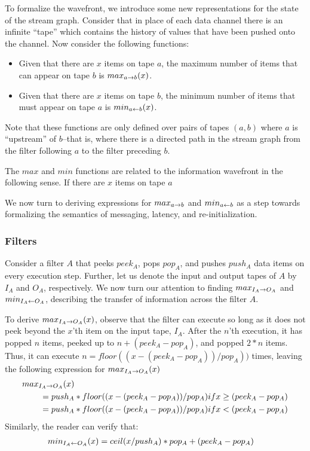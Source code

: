 To formalize the wavefront, we introduce some new representations for
the state of the stream graph.  Consider that in place of each data
channel there is an infinite ``tape'' which contains the history of
values that have been pushed onto the channel.  Now consider the
following functions:

\begin{itemize}

\item Given that there are $x$ items on tape $a$, the maximum number
of items that can appear on tape $b$ is $max_{a \rightarrow b}(x)$.

\item Given that there are $x$ items on tape $b$, the minimum number
of items that must appear on tape $a$ is $min_{a \leftarrow b}(x)$.

\end{itemize}

Note that these functions are only defined over pairs of tapes $(a,
b)$ where $a$ is ``upstream'' of $b$--that is, where there is a
directed path in the stream graph from the filter following $a$ to the
filter preceding $b$.

The $max$ and $min$ functions are related to the information wavefront
in the following sense.  If there are $x$ items on tape $a$

We now turn to deriving expressions for $max_{a \rightarrow b}$ and $min_{a \leftarrow b}$ as
a step towards formalizing the semantics of messaging, latency, and
re-initialization.

\subsubsection{Filters}

Consider a filter $A$ that peeks $peek_A$, pops $pop_A$, and pushes
$push_A$ data items on every execution step.  Further, let us denote
the input and output tapes of $A$ by $I_A$ and $O_A$, respectively.
We now turn our attention to finding $max_{I_A \rightarrow O_A}$ and
$min_{I_A \leftarrow O_A}$, describing the transfer of information across the
filter $A$.

To derive $max_{I_A \rightarrow O_A}(x)$, observe that the filter can execute so
long as it does not peek beyond the $x$'th item on the input tape,
$I_A$.  After the $n$'th execution, it has popped $n$ items, peeked up
to $n + (peek_A - pop_A)$, and popped $2 * n$ items.  Thus, it can
execute $n = floor((x - (peek_A - pop_A)) / pop_A))$ times, leaving
the following expression for $max_{I_A \rightarrow O_A}(x)$
\begin{eqnarray*}
max_{I_A \rightarrow O_A}(x)& \\ = push_A&*floor((x-(peek_A-pop_A))/pop_A) if x \ge (peek_A-pop_A) \\
         = push_A&*floor((x-(peek_A-pop_A))/pop_A) if x <  (peek_A-pop_A)
\end{eqnarray*}
Similarly, the reader can verify that:
\begin{eqnarray*}
min_{I_A \leftarrow O_A}(x)&= ceil(x/push_A)*pop_A+(peek_A-pop_A)
\end{eqnarray*}

